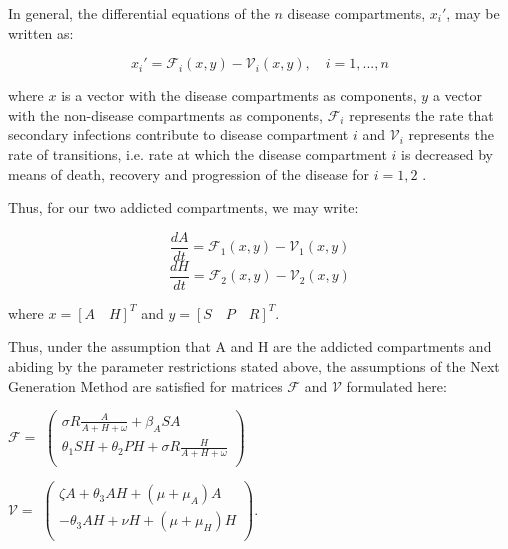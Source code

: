 \documentclass[12pt]{article}
\begin{document}
In general, the differential equations of the $n$ disease compartments, $x_i'$, may be written as: 

\[{x_i'} = \mathscr{F}_{i} (x,y)-\mathscr{V}_i (x,y),\quad i=1,...,n\] 

where $x$ is a vector with the disease compartments as components, $y$ a vector with the non-disease compartments as components, $\mathscr{F}_{i}$ represents the rate that secondary infections contribute to disease compartment $i$ and $\mathscr{V}_{i}$ represents the rate of transitions, i.e. rate at which the disease compartment $i$ is decreased by means of death, recovery and progression of the disease for $i=1,2$ \cite{Driessche}. 

Thus, for our two addicted compartments, we may write: 

$$\dfrac{dA}{dt} = \mathscr{F}_{1} (x,y)-\mathscr{V}_{1}(x,y)$$
$$\dfrac{dH}{dt} = \mathscr{F}_{2} (x,y)-\mathscr{V}_{2}(x,y)$$

where $x= {[A\quad H]}^{T}$ and $y= {[S\quad P\quad R]}^{T}$.



Thus, under the assumption that A and H are the addicted compartments and abiding by the parameter restrictions stated above, the assumptions of the Next Generation Method are satisfied for matrices $\mathscr{F}$ and $\mathscr{V}$ formulated here:

\begin{center}
$\mathscr{F}=$
$ \begin{pmatrix}

\sigma R \frac{A}{A+H+\omega}+\beta_{A} SA \\
\theta_{1}SH+\theta_{2}PH+\sigma R \frac{H}{A+H+\omega} \\
\end{pmatrix}$



$\mathscr{V}=$
$ \begin{pmatrix}

\zeta A+\theta_{3} AH + (\mu +\mu_{A})A \\
-\theta_{3}AH+\nu H +(\mu +\mu_{H}) H \\
\end{pmatrix}$.
\end{center}
\end{document}
